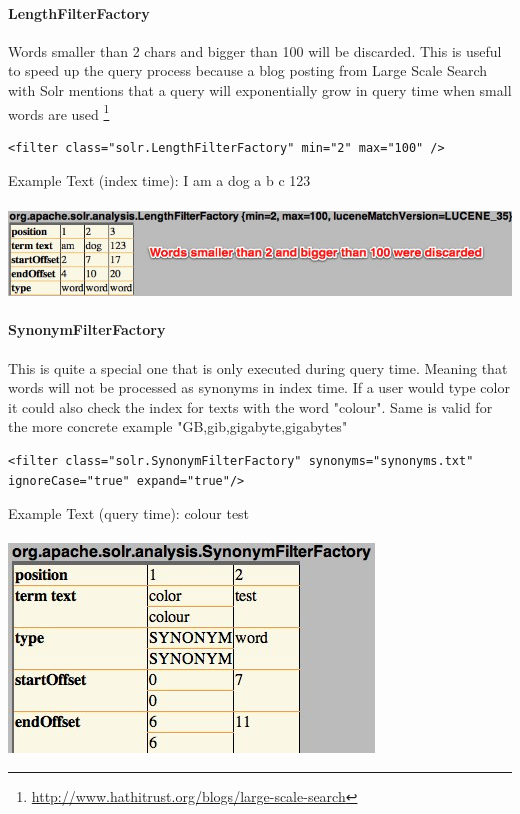 \paragraph{LengthFilterFactory} Words smaller than 2 chars and bigger than 100 will be discarded. This is useful to speed up the query process because a blog posting from Large Scale Search with Solr mentions that a query will exponentially grow in query time when small words are used \footnote{\url{http://www.hathitrust.org/blogs/large-scale-search}}
\begin{verbatim}
<filter class="solr.LengthFilterFactory" min="2" max="100" />
\end{verbatim}
Example Text (index time): I am a dog a b c 123
\mbox{} \\
\mbox{} \\
\includegraphics[width=\textwidth]{images/lengthfilterfactory.jpg}

\paragraph{SynonymFilterFactory} This is quite a special one that is only executed during query time. Meaning that words will not be processed as synonyms in index time. If a user would type color it could also check the index for texts with the word "colour". Same is valid for the more concrete example "GB,gib,gigabyte,gigabytes"
\begin{verbatim}
<filter class="solr.SynonymFilterFactory" synonyms="synonyms.txt" ignoreCase="true" expand="true"/>
\end{verbatim}
Example Text (query time): colour test
\mbox{} \\
\mbox{} \\
\includegraphics[width=\textwidth/2]{images/synonymfilterfactory.jpg}


